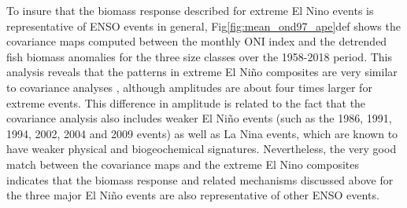 To insure that the biomass response described for extreme El Nino events is representative of ENSO events in general, Fig\ref{fig:mean_ond97_ape}def shows the covariance maps computed between the monthly ONI index and the detrended fish biomass anomalies for the three size classes over the 1958-2018 period. This analysis reveals that the patterns in extreme El Niño composites are very similar to covariance analyses , although amplitudes are about four times larger for extreme events. This  difference  in amplitude is related to the fact that the covariance analysis also includes weaker El Niño events (such as the 1986, 1991, 1994, 2002, 2004 and 2009 events) as well as La Nina events, which are known to have weaker physical and biogeochemical signatures. Nevertheless, the very good match between the covariance maps and the extreme El Nino composites indicates that the biomass response and related mechanisms discussed above for the three major El Niño events are also representative of other ENSO events.

